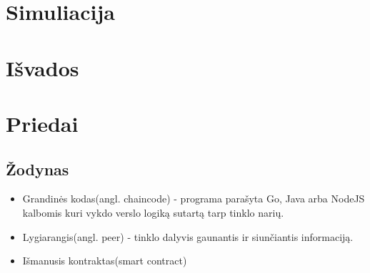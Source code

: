 \documentclass{VUMIFPSkursinis}
\begin{document}
\section{Simuliacija}
\section{Išvados}

\section{Priedai}
\subsection{Žodynas}
\begin{itemize}
	\item{Grandinės kodas(angl. chaincode) - programa parašyta Go, Java arba NodeJS kalbomis kuri vykdo
 verslo logiką sutartą tarp tinklo narių.}
	\item{Lygiarangis(angl. peer) - tinklo dalyvis gaunantis ir siunčiantis informaciją.}
	\item{Išmanusis kontraktas(smart contract)}
\end{itemize}


\printbibliography[heading=bibintoc]  
\end{document}
